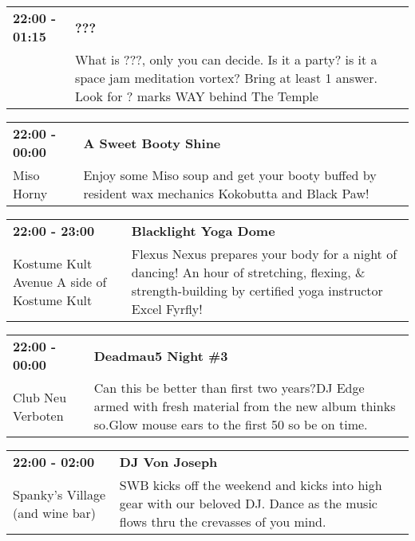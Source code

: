 \begin{tabular}{ p{1in} p{2.2in} }
    \textbf{22:00 - 01:15} & \textbf{???} \\
    ~ \newline  & What is ???, only you can decide. Is it a  party? is it a space jam meditation vortex? Bring at least 1 answer. Look for ? marks WAY behind The Temple \\
    \hline 
\end{tabular}
    
\begin{tabular}{ p{1in} p{2.2in} }
    \textbf{22:00 - 00:00} & \textbf{A Sweet Booty Shine} \\
    Miso Horny \newline  & Enjoy some Miso soup and get your booty buffed by resident wax mechanics Kokobutta and Black Paw! \\
    \hline 
\end{tabular}
    
\begin{tabular}{ p{1in} p{2.2in} }
    \textbf{22:00 - 23:00} & \textbf{Blacklight Yoga Dome} \\
    Kostume Kult \newline Avenue A side of Kostume Kult & Flexus Nexus prepares your body for a night of dancing! An hour of stretching, flexing, \& strength-building by certified yoga instructor Excel Fyrfly! \\
    \hline 
\end{tabular}
    
\begin{tabular}{ p{1in} p{2.2in} }
    \textbf{22:00 - 00:00} & \textbf{Deadmau5 Night \#3} \\
    Club Neu Verboten \newline  & Can this be better than first two years?DJ Edge armed with fresh material from the new album thinks so.Glow mouse ears to the first 50 so be on time. \\
    \hline 
\end{tabular}
    
\begin{tabular}{ p{1in} p{2.2in} }
    \textbf{22:00 - 02:00} & \textbf{DJ Von Joseph} \\
    Spanky's Village (and wine bar) \newline  & SWB kicks off the weekend and kicks into high gear with our beloved DJ.  Dance as the music flows thru the crevasses of you mind. \\
    \hline 
\end{tabular}
    
